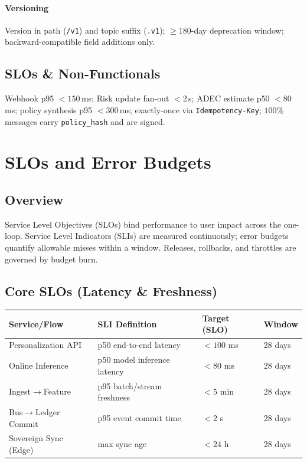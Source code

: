 \documentclass[11pt]{article}
\theoremstyle{plain}
\begin{document}
\paragraph{Versioning}
Version in path (\texttt{/v1}) and topic suffix (\texttt{.v1}); \(\ge\)180-day deprecation window; backward-compatible field additions only.

\subsection{SLOs \& Non-Functionals}
Webhook p95 $<150$\,ms; Risk update fan-out $<$2\,s; ADEC estimate p50 $<80$\,ms; policy synthesis p95 $<300$\,ms; exactly-once via \texttt{Idempotency-Key}; $100\%$ messages carry \texttt{policy\_hash} and are signed.

\section{SLOs and Error Budgets}

\subsection{Overview}
Service Level Objectives (SLOs) bind performance to user impact across the one-loop. Service Level Indicators (SLIs) are measured continuously; error budgets quantify allowable misses within a window. Releases, rollbacks, and throttles are governed by budget burn.

\subsection{Core SLOs (Latency \& Freshness)}
\begin{center}
\begin{tabular}{l l l l}
\hline
\textbf{Service/Flow} & \textbf{SLI Definition} & \textbf{Target (SLO)} & \textbf{Window} \\
\hline
Personalization API & p50 end-to-end latency & $<100$ ms & 28 days \\
Online Inference & p50 model inference latency & $<80$ ms & 28 days \\
Ingest$\rightarrow$Feature & p95 batch/stream freshness & $<5$ min & 28 days \\
Bus$\rightarrow$Ledger Commit & p95 event commit time & $<2$ s & 28 days \\
Sovereign Sync (Edge) & max sync age & $<24$ h & 28 days \\
\hline
\end{tabular}
\end{center}
\end{document}
